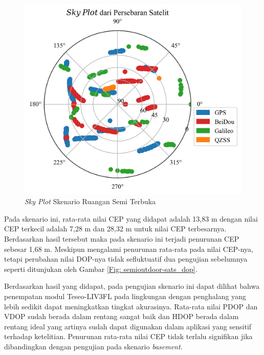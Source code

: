 \begin{figure}[H]
	\centering
	\captionsetup{justification=centering}
	\includegraphics[width=12cm]{contents/chapter-4/3-skenario-semioutdoor/sky_plot.png}
	\caption{\textit{Sky Plot} Skenario Ruangan Semi Terbuka}
	\label{Fig: semioutdoor-sky_plot}
\end{figure}

Pada skenario ini, rata-rata nilai CEP yang didapat adalah 13,83 m dengan nilai CEP terkecil adalah 7,28 m dan 28,32 m untuk nilai CEP terbesarnya. Berdasarkan hasil tersebut maka pada skenario ini terjadi penurunan CEP sebesar 1,68 m. Meskipun mengalami penurunan rata-rata pada nilai CEP-nya, tetapi perubahan nilai DOP-nya tidak sefluktuatif dua pengujian sebelumnya seperti ditunjukan oleh Gambar \ref{Fig: semioutdoor-sats_dop}.

Berdasarkan hasil yang didapat, pada pengujian skenario ini dapat dilihat bahwa penempatan modul Teseo-LIV3FL pada lingkungan dengan penghalang yang lebih sedikit dapat meningkatkan tingkat akurasinya. Rata-rata nilai PDOP dan VDOP sudah berada dalam rentang sangat baik dan HDOP berada dalam rentang ideal yang artinya sudah dapat digunakan dalam aplikasi yang sensitif terhadap ketelitian. Penurunan rata-rata nilai CEP tidak terlalu signifikan jika dibandingkan dengan pengujian pada skenario \textit{basement}.

